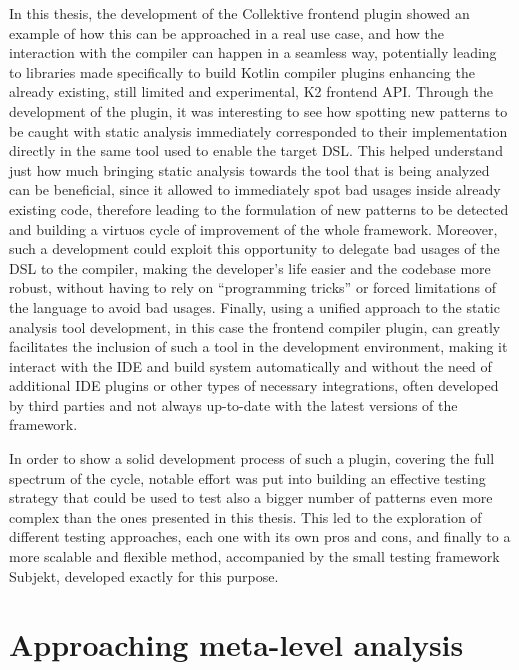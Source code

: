 \documentclass[12pt,a4paper,openright,twoside]{book}
\begin{document}
In this thesis, the development of the Collektive frontend plugin showed an
example of how this can be approached in a real use case, and how the
interaction with the compiler can happen in a seamless way, potentially leading
to libraries made specifically to build Kotlin compiler plugins enhancing the
already existing, still limited and experimental, K2 frontend API.
%
Through the development of the plugin, it was interesting to see how spotting
new patterns to be caught with static analysis immediately corresponded to their
implementation directly in the same tool used to enable the target \ac{DSL}.
This helped understand just how much bringing static analysis towards the tool
that is being analyzed can be beneficial, since it allowed to immediately spot
bad usages inside already existing code, therefore leading to the formulation of
new patterns to be detected and building a virtuos cycle of improvement of the
whole framework. Moreover, such a development could exploit this opportunity to
delegate bad usages of the \ac{DSL} to the compiler, making the developer's life
easier and the codebase more robust, without having to rely on ``programming
tricks'' or forced limitations of the language to avoid bad usages.
%
Finally, using a unified approach to the static analysis tool development, in 
this case the frontend compiler plugin, can greatly facilitates the inclusion 
of such a tool in the development environment, making it interact with the 
\ac{IDE} and build system automatically and without the need of additional
\ac{IDE} plugins or other types of necessary integrations, often developed by
third parties and not always up-to-date with the latest versions of the
framework.

In order to show a solid development process of such a plugin, covering the
full spectrum of the cycle, notable effort was put into building an effective
testing strategy that could be used to test also a bigger number of patterns
even more complex than the ones presented in this thesis. This led to the 
exploration of different testing approaches, each one with its own pros and
cons, and finally to a more scalable and flexible method, accompanied by
the small testing framework Subjekt, developed exactly for this purpose.

\section{Approaching meta-level analysis}
\end{document}
